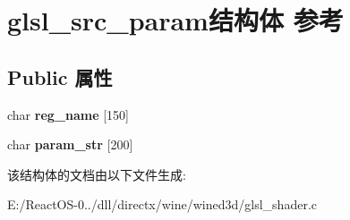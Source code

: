 \hypertarget{structglsl__src__param}{}\section{glsl\+\_\+src\+\_\+param结构体 参考}
\label{structglsl__src__param}
\subsection*{Public 属性}
\begin{DoxyCompactItemize}
\item 
\mbox{\label{structglsl__src__param_ae6821b4fff6e9a03c3e57d97b107a0b1}} 
char {\bfseries reg\+\_\+name} \mbox{[}150\mbox{]}
\item 
\mbox{\label{structglsl__src__param_acead99bd61fc58ccc22095b196f41007}} 
char {\bfseries param\+\_\+str} \mbox{[}200\mbox{]}
\end{DoxyCompactItemize}


该结构体的文档由以下文件生成\+:\begin{DoxyCompactItemize}
\item 
E\+:/\+React\+O\+S-\/0../dll/directx/wine/wined3d/glsl\+\_\+shader.\+c\end{DoxyCompactItemize}
